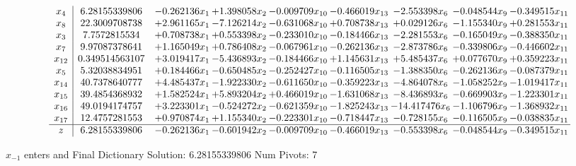\documentclass[10pt]{article}
\begin{document}
 \[\begin{array}{c| c c@{\hskip 2pt} c@{\hskip 2pt} c@{\hskip 2pt} c@{\hskip 2pt} c@{\hskip 2pt} c@{\hskip 2pt} c@{\hskip 2pt} }
 x_{4}   &  6.28155339806 & -0.262136 x_{1} & + 1.398058 x_{2} & -0.009709 x_{10} & -0.466019 x_{13} & -2.553398 x_{6} & -0.048544 x_{9} & -0.349515 x_{11}\\
 x_{8}   &  22.3009708738 & + 2.961165 x_{1} & -7.126214 x_{2} & -0.631068 x_{10} & + 0.708738 x_{13} & + 0.029126 x_{6} & -1.155340 x_{9} & + 0.281553 x_{11}\\
 x_{3}   &  7.7572815534 & + 0.708738 x_{1} & + 0.553398 x_{2} & -0.233010 x_{10} & -0.184466 x_{13} & -2.281553 x_{6} & -0.165049 x_{9} & -0.388350 x_{11}\\
 x_{7}   &  9.97087378641 & + 1.165049 x_{1} & + 0.786408 x_{2} & -0.067961 x_{10} & -0.262136 x_{13} & -2.873786 x_{6} & -0.339806 x_{9} & -0.446602 x_{11}\\
 x_{12}   &  0.349514563107 & + 3.019417 x_{1} & -5.436893 x_{2} & -0.184466 x_{10} & + 1.145631 x_{13} & + 5.485437 x_{6} & + 0.077670 x_{9} & + 0.359223 x_{11}\\
 x_{5}   &  5.32038834951 & + 0.184466 x_{1} & -0.650485 x_{2} & -0.252427 x_{10} & -0.116505 x_{13} & -1.388350 x_{6} & -0.262136 x_{9} & -0.087379 x_{11}\\
 x_{14}   &  40.7378640777 & + 4.485437 x_{1} & -1.922330 x_{2} & -0.611650 x_{10} & -0.359223 x_{13} & -4.864078 x_{6} & -1.058252 x_{9} & -1.019417 x_{11}\\
 x_{15}   &  39.4854368932 & + 1.582524 x_{1} & + 5.893204 x_{2} & + 0.466019 x_{10} & -1.631068 x_{13} & -8.436893 x_{6} & -0.669903 x_{9} & -1.223301 x_{11}\\
 x_{16}   &  49.0194174757 & + 3.223301 x_{1} & -0.524272 x_{2} & -0.621359 x_{10} & -1.825243 x_{13} & -14.417476 x_{6} & -1.106796 x_{9} & -1.368932 x_{11}\\
 x_{17}   &  12.4757281553 & + 0.970874 x_{1} & + 1.155340 x_{2} & -0.223301 x_{10} & -0.718447 x_{13} & -0.728155 x_{6} & -0.116505 x_{9} & -0.038835 x_{11}\\
\hline
z    &  6.28155339806 & -0.262136 x_{1} & -0.601942 x_{2} & -0.009709 x_{10} & -0.466019 x_{13} & -0.553398 x_{6} & -0.048544 x_{9} & -0.349515 x_{11}\\
\end{array}\]


 $ x_{-1} $ enters and Final Dictionary
Solution:  6.28155339806
Num Pivots:  7
\end{document}
